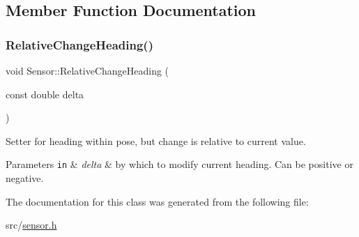 \subsection{Member Function Documentation}
\mbox{\label{class_sensor_ad93b67ee775232e4b6e939fd043f0b84}} 
\subsubsection{\texorpdfstring{Relative\+Change\+Heading()}{RelativeChangeHeading()}}
{\footnotesize\ttfamily void Sensor\+::\+Relative\+Change\+Heading (\begin{DoxyParamCaption}\item[{const double}]{delta }\end{DoxyParamCaption})\hspace{0.3cm}{\ttfamily [inline]}}



Setter for heading within pose, but change is relative to current value. 


\begin{DoxyParams}[1]{Parameters}
\mbox{\tt in}  & {\em delta} & by which to modify current heading. Can be positive or negative. \\
\hline
\end{DoxyParams}


The documentation for this class was generated from the following file\+:\begin{DoxyCompactItemize}
\item 
src/\mbox{\hyperlink{sensor_8h}{sensor.\+h}}\end{DoxyCompactItemize}
